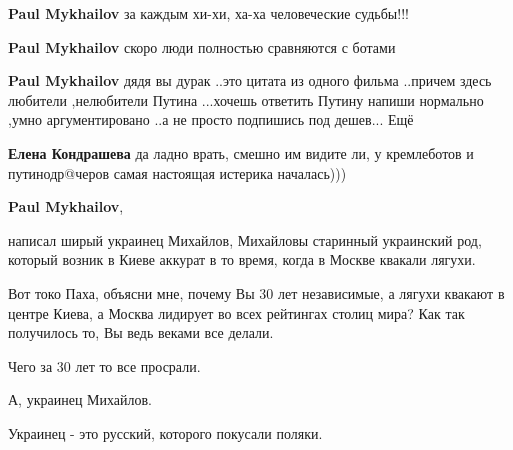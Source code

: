 \begin{itemize}
\begin{itemize}
\textbf{Paul Mykhailov} за каждым хи-хи, ха-ха человеческие судьбы!!!

 
\textbf{Paul Mykhailov} скоро люди полностью сравняются с ботами \Smiley[1.0][yellow]

 
\textbf{Paul Mykhailov} дядя вы дурак ..это цитата из одного фильма ..причем здесь любители ,нелюбители Путина ...хочешь ответить Путину напиши нормально ,умно аргументировано ..а не просто подпишись под дешев... Ещё

 
\textbf{Елена Кондрашева} да ладно врать, смешно им видите ли, у кремлеботов и путинодр@черов самая настоящая истерика началась)))

 
\textbf{Paul Mykhailov}, 

написал ширый украинец Михайлов, Михайловы старинный украинский род, который
возник в Киеве аккурат в то время, когда в Москве квакали лягухи.

Вот токо Паха, объясни мне, почему Вы 30 лет независимые, а лягухи квакают в
центре Киева, а Москва лидирует во всех рейтингах столиц мира? Как так
получилось то, Вы ведь веками все делали.

Чего за 30 лет то все просрали.

А, украинец Михайлов.

Украинец - это русский, которого покусали поляки.


 

\end{itemize}
\end{itemize}
